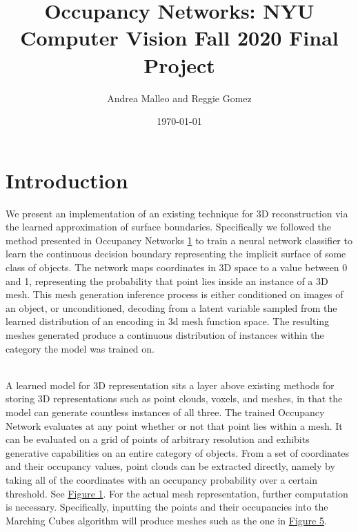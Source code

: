 \documentclass[11pt]{article}
\author{Andrea Malleo and Reggie Gomez}
\date{\today}
\title{Occupancy Networks: NYU Computer Vision Fall 2020 Final Project}
\begin{document}
\maketitle
\section{Introduction}

\begin{multicols}{2}
  We present an implementation of an existing technique for 3D reconstruction via the learned approximation of surface boundaries. Specifically we followed the method presented in Occupancy Networks \hyperlink{ref1}{1} to train a neural network classifier to learn the continuous decision boundary representing the implicit surface of some class of objects. The network maps coordinates in 3D space to a value between 0 and 1, representing the probability that point lies inside an instance of a 3D mesh. This mesh generation inference process is either conditioned on images of an object, or unconditioned, decoding from a latent variable sampled from the learned distribution of an encoding in 3d mesh function space. The resulting meshes generated produce a continuous distribution of instances within the category the model was trained on.
  \par
  \\
  A learned model for 3D representation sits a layer above existing methods for storing 3D representations such as point clouds, voxels, and meshes, in that the model can generate countless instances of all three. The trained Occupancy Network evaluates at any point whether or not that point lies within a mesh. It can be evaluated on a grid of points of arbitrary resolution and exhibits generative capabilities on an entire category of objects. From a set of coordinates and their occupancy values, point clouds can be extracted directly, namely by taking all of the coordinates with an occupancy probability over a certain threshold. See \hyperlink{fig1}{Figure 1}. For the actual mesh representation, further computation is necessary. Specifically, inputting the points and their occupancies into the Marching Cubes algorithm will produce meshes such as the one in \hyperlink{fig5}{Figure 5}.


\end{multicols}
\end{document}
